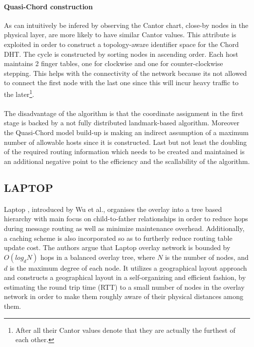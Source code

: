 \documentclass[a4paper,10pt]{article}
\begin{document}
\paragraph{Quasi-Chord construction}
As can intuitively be infered by observing the Cantor chart, close-by nodes in the physical layer, are more likely to have similar Cantor values. This attribute is exploited in order to construct a topology-aware identifier space for the Chord DHT. The cycle is constructed by sorting nodes in ascending order. Each host maintains 2 finger tables, one for clockwise and one for counter-clockwise stepping. This helps with the connectivity of the network because its not allowed to connect the first node with the last one since this will incur heavy traffic to the later\footnote{After all their Cantor values denote that they are actually the furthest of each other.}.

\paragraph{}
The disadvantage of the algorithm is that the coordinate assignment in the first stage is backed by a not fully distributed landmark-based algorithm. Moreover the Quasi-Chord model build-up is making an indirect assumption of a maximum number of allowable hosts since it is constructed. Last but not least the doubling of the required routing information which needs to be created and maintained is an additional negative point to the efficiency and the scallability of the algorithm.

\subsection{LAPTOP}

\paragraph{}
Laptop \cite{wu_laptop_2007}, introduced by Wu et al., organises the overlay into a tree based hierarchy with main focus on child-to-father relationships in order to reduce hops during message routing as well as minimize maintenance overhead. Additionally, a caching scheme is also incorporated so as to furtherly reduce routing table update cost. The authors argue that Laptop overlay network is bounded by $O\left( log_d N \right)$ hops in a balanced overlay tree, where $N$ is the number of nodes, and $d$ is the maximum degree of each node. It utilizes a geographical layout approach  and constructs a geographical layout in a self-organizing and efficient fashion, by estimating the round trip time (RTT) to a small number of nodes in the overlay network in order to make them roughly aware of their physical distances among them.
\end{document}
